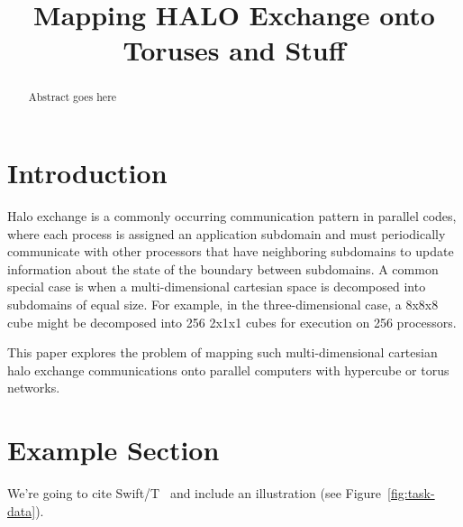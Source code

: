 \documentclass[conference,10pt]{IEEEtran}
\begin{document}
\setlength{\pdfpageheight}{\paperheight}
\setlength{\pdfpagewidth}{\paperwidth}


\title{Mapping HALO Exchange onto Toruses and Stuff}

\author{
}

\maketitle

 
\begin{abstract}
Abstract goes here
\end{abstract}

\section{Introduction}

Halo exchange is a commonly occurring communication pattern in parallel
codes, where each process is assigned an application subdomain and
must periodically communicate with other processors that have neighboring
subdomains to update information about the state of the boundary between
subdomains.  A common special case is when a multi-dimensional cartesian
space is decomposed into subdomains of equal size.  For example, in the
three-dimensional case, a 8x8x8 cube might be decomposed into 256 2x1x1 cubes
for execution on 256 processors.

This paper explores the problem of mapping such multi-dimensional cartesian
halo exchange communications onto parallel computers with hypercube or
torus networks.

\section{Example Section}

We're going to cite Swift/T~\cite{SwiftT_2013} and include an illustration
(see Figure~\ref{fig:task-data}). 
\end{document}
